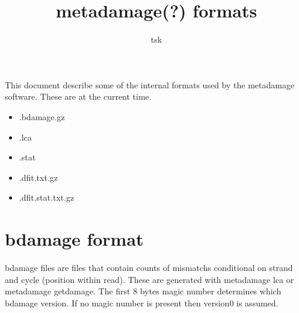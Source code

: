 \documentclass[10pt]{article}
\begin{document}
\title{metadamage(?) formats}
\author{tsk}
\maketitle
\vspace*{1em}

This document describe some of the internal formats used by the metadamage software. These are at the current time.
\begin{itemize}
\item .bdamage.gz
\item .lca
\item .stat
\item .dfit.txt.gz
\item .dfit.stat.txt.gz
\end{itemize}

\section{bdamage format}
bdamage files are files that contain counts of mismatchs conditional on strand and cycle (position within read). These are generated with metadamage lca or metadamage getdamage. 
The first 8 bytes magic number determines which bdamage version. If no magic number is present then version0 is assumed. 
\end{document}
